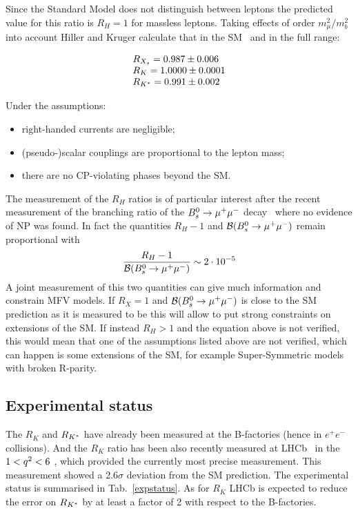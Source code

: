 Since the Standard Model does not distinguish between leptons the predicted value for this ratio 
is $R_H = 1$ for massless leptons. Taking effects of order $m_\mu^2 / m_b^2$ into account Hiller
and Kruger calculate that in the SM~\cite{Hiller:2003js} and in the full \qsq range:

\begin{equation}
\begin{array}{l}
R_{X_s} = 0.987 \pm 0.006 \\
R_K = 1.0000 \pm 0.0001 \\
R_{{{K}^*}} = 0.991 \pm 0.002
\end{array}
\end{equation}

Under the assumptions:

\begin{itemize}
\item right-handed currents are negligible;
\item (pseudo-)scalar couplings are proportional to the lepton mass;
\item there are no CP-violating phases beyond the SM.
\end{itemize}

The measurement of the $R_H$ ratios is of particular interest after the recent
measurement of the branching ratio of the ${{B}^0_{s}}\rightarrow{\ensuremath{\mu^+\mu^-}}$ decay~\cite{CMS:2014xfa} where no
evidence of NP was found. In fact the quantities $R_H - 1$ and
${\cal B}({{B}^0_{s}} \rightarrow {\ensuremath{\mu^+\mu^-}})$ remain proportional with
%
\begin{equation}
\frac{R_H - 1}{{\cal B}({{B}^0_{s}} \rightarrow {\ensuremath{\mu^+\mu^-}})} \sim 2 \cdot 10^{-5}
\end{equation}
%
A joint measurement of this two quantities can give much information and constrain MFV models.
If $R_X = 1$ and ${\cal B}({{B}^0_{s}} \rightarrow {\ensuremath{\mu^+\mu^-}})$ is close to the SM prediction as it is measured to be
this will allow to put strong constraints on extensions of the SM.
If instead $R_H > 1$ and the equation above is not verified, this would mean that one of the
assumptions listed above are not verified, which can happen is some extensions of the SM,
for example Super-Symmetric models with broken R-parity.

\subsection{Experimental status}

The $R_K$ and $R_{{{K}^*}}$ have already been measured at the B-factories (hence in $e^+e^-$ collisions).
And the $R_K$ ratio has been also recently measured at LHCb~\cite{LHCb-PAPER-2014-024} in the $1 < {q^2} < 6$ \gevgevcccc,
which provided the currently most precise measurement. This measurement showed a 2.6$\sigma$
deviation from the SM prediction. 
The experimental status is summarised in Tab.~\ref{expstatus}. As for $R_K$ LHCb is expected
to reduce the error on $R_{{{K}^*}}$ by at least a factor of 2 with respect to the B-factories.

